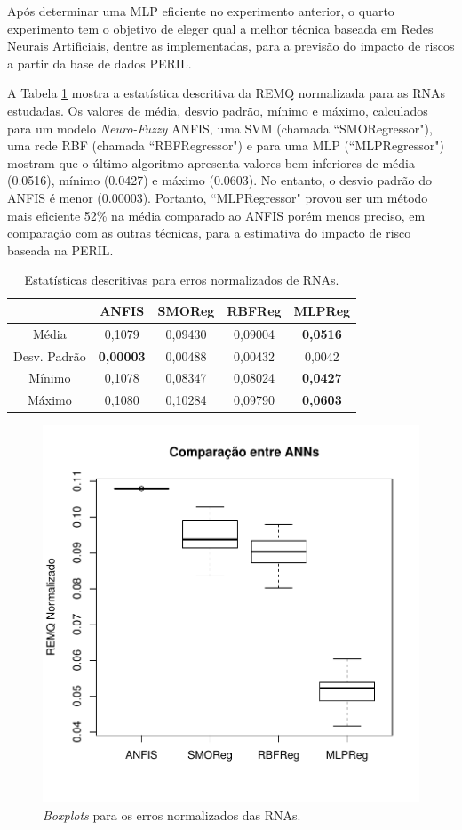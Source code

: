 Após determinar uma MLP eficiente no experimento anterior, o quarto experimento tem o objetivo de eleger qual a melhor técnica baseada em Redes Neurais Artificiais, dentre as implementadas, para a previsão do impacto de riscos a partir da base de dados PERIL.

A Tabela \ref{tab:anns_descriptive} mostra a estatística descritiva da REMQ normalizada para as RNAs estudadas. Os valores de média, desvio padrão, mínimo e máximo, calculados para um modelo \textit{Neuro-Fuzzy} ANFIS, uma SVM (chamada ``SMORegressor"), uma rede RBF (chamada ``RBFRegressor") e para uma MLP (``MLPRegressor") mostram que o último algoritmo apresenta valores bem inferiores de média (0.0516), mínimo (0.0427) e máximo (0.0603). No entanto, o desvio padrão do ANFIS é menor (0.00003). Portanto, ``MLPRegressor" provou ser um método mais eficiente 52\% na média comparado ao ANFIS porém menos preciso, em comparação com as outras técnicas, para a estimativa do impacto de risco baseada na PERIL.

\begin{table}[b]
\caption{Estatísticas descritivas para erros normalizados de RNAs.}\label{tab:anns_descriptive} \centering
\begin{tabular}{|c|c|c|c|c|}
  \hline
   & ANFIS & SMOReg & RBFReg & MLPReg  \\
  \hline
  Média & 0,1079 & 0,09430 & 0,09004 & \textbf{0,0516}   \\
  \hline
  Desv. Padrão & \textbf{0,00003} & 0,00488 & 0,00432 & 0,0042   \\
  \hline
  Mínimo & 0,1078 & 0,08347 & 0,08024	 & \textbf{0,0427}   \\
  \hline
  Máximo & 0,1080 & 0,10284 & 0,09790 & \textbf{0,0603}   \\
  \hline
\end{tabular}
\end{table}

\begin{figure}[!b]
  \vspace{-0.2cm}
  \centering
  \includegraphics[trim = 1mm 12mm 1mm 1mm,clip,width=0.7\columnwidth]{image/anns_ex4.pdf}
  \caption{\textit{Boxplots} para os erros normalizados das RNAs.}
  \label{fig:anns_result}
\end{figure}

